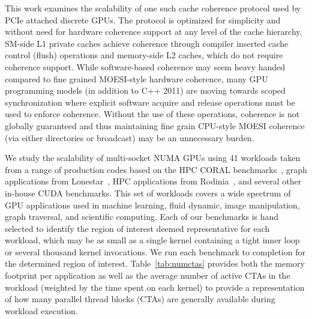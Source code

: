 This work examines the scalability of one such cache coherence 
protocol used by PCIe attached discrete GPUs. The protocol is optimized for simplicity
and without need for hardware coherence support at any level of the cache hierarchy.  
SM-side L1 private caches achieve coherence through 
compiler inserted cache control (flush) operations and memory-side L2 caches, which do not require 
coherence support. While software-based 
coherence may seem heavy handed compared to fine grained MOESI-style hardware 
coherence, many GPU programming models (in addition to C++ 2011) are moving 
towards scoped synchronization where explicit software acquire and release 
operations must be used to enforce coherence.  Without the use of these 
operations, coherence is not globally guaranteed and thus maintaining fine 
grain CPU-style MOESI coherence (via either directories or broadcast) may be an 
unnecessary burden.

We study the scalability of multi-socket NUMA GPUs using 41 workloads 
taken from a range of 
production codes based on the HPC CORAL benchmarks~\cite{coral}, graph 
applications from Lonestar~\cite{lonestar}, HPC applications from 
Rodinia~\cite{Che2009}, and several other in-house CUDA benchmarks. 
This set of workloads covers a wide spectrum of GPU applications used in 
machine learning, fluid dynamic, image manipulation, graph traversal, and
scientific computing.  Each of our benchmarks is hand selected to identify
the region of interest deemed representative for each workload, which may
be as small as a single kernel containing a tight inner loop or several thousand
kernel invocations.  We run each benchmark to completion for the determined
region of interest. Table~\ref{tab:numctas} provides both the memory footprint per application as well as the average number of active CTAs in the workload
(weighted by the time spent on each kernel) to provide a representation of 
how many parallel thread blocks (CTAs) are generally available
during workload execution.

